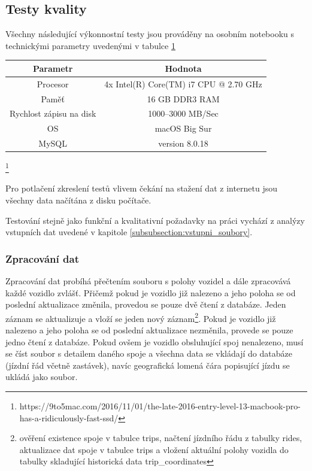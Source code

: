 \subsection{Testy kvality}


Všechny následující výkonnostní testy jsou prováděny na osobním notebooku s technickými parametry uvedenými v tabulce \ref{table:hw}


\begin{center}
   \begin{table}[ht]
\centering
\begin{tabular}{|c|c|}
\hline
Parametr & Hodnota \\ \hline \hline
Procesor & 4x Intel(R) Core(TM) i7 CPU @ 2.70 GHz\\ \hline
Paměť & 16 GB DDR3 RAM  \\  \hline
Rychlost zápisu na disk & 1000--3000 MB/Sec \\ \hline
OS & macOS Big Sur\\ \hline
MySQL & version 8.0.18\\ \hline
\end{tabular}
\label{table:hw}
\end{table}
\end{center}
\footnote{https://9to5mac.com/2016/11/01/the-late-2016-entry-level-13-macbook-pro-has-a-ridiculously-fast-ssd/}


\bigbreak


Pro potlačení zkreslení testů vlivem čekání na stažení dat z internetu jsou všechny data načítána z disku počítače.


\bigbreak


Testování stejně jako funkční a kvalitativní požadavky na práci vychází z analýzy vstupních dat uvedené v kapitole \ref{subsubsection:vstupni_soubory}.


\subsubsection{Zpracování dat}


Zpracování dat probíhá přečtením souboru s polohy vozidel a dále zpracovává každé vozidlo zvlášť. Přičemž pokud je vozidlo již nalezeno a jeho poloha se od poslední aktualizace změnila, provedou se pouze dvě čtení z databáze. Jeden záznam se aktualizuje a vloží se jeden nový záznam\footnote{ověření existence spoje v tabulce trips, načtení jízdního řádu z tabulky rides, aktualizace dat spoje v tabulce trips a vložení aktuální polohy vozidla do tabulky skladující historická data trip\_coordinates}. Pokud je vozidlo již nalezeno a jeho poloha se od poslední aktualizace nezměnila, provede se pouze jedno čtení z databáze. Pokud ovšem je vozidlo obsluhující spoj nenalezeno, musí se číst soubor s detailem daného spoje a všechna data se vkládají do databáze (jízdní řád včetně zastávek), navíc geografická lomená čára popisující jízdu se ukládá jako soubor.


